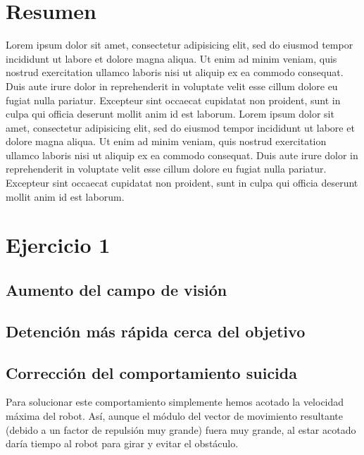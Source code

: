 \documentclass[a4paper, 11pt, titlepage]{article}
\begin{document}
  \maketitle
  \tableofcontents
  \newpage

  \section{Resumen}
  Lorem ipsum dolor sit amet, consectetur adipisicing elit, sed do eiusmod tempor incididunt ut labore et dolore magna aliqua. Ut enim ad minim veniam, quis nostrud exercitation ullamco laboris nisi ut aliquip ex ea commodo consequat. Duis aute irure dolor in reprehenderit in voluptate velit esse cillum dolore eu fugiat nulla pariatur. Excepteur sint occaecat cupidatat non proident, sunt in culpa qui officia deserunt mollit anim id est laborum.
  Lorem ipsum dolor sit amet, consectetur adipisicing elit, sed do eiusmod tempor incididunt ut labore et dolore magna aliqua. Ut enim ad minim veniam, quis nostrud exercitation ullamco laboris nisi ut aliquip ex ea commodo consequat. Duis aute irure dolor in reprehenderit in voluptate velit esse cillum dolore eu fugiat nulla pariatur. Excepteur sint occaecat cupidatat non proident, sunt in culpa qui officia deserunt mollit anim id est laborum.

  \section{Ejercicio 1}

  \subsection{Aumento del campo de visión}

  \subsection{Detención más rápida cerca del objetivo}

  \subsection{Corrección del comportamiento suicida}
    Para solucionar este comportamiento simplemente hemos acotado la velocidad máxima del robot. Así, aunque el módulo del vector de movimiento resultante (debido a un factor de repulsión muy grande) fuera muy grande, al estar acotado daría tiempo al robot para girar y evitar el obstáculo. 
\end{document}
